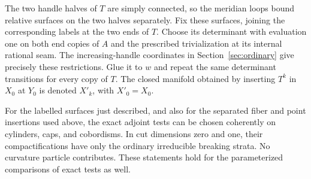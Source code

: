The two handle halves of $T$ are simply connected, so the meridian
loops bound relative surfaces on the two halves separately.  Fix these
surfaces, joining the corresponding labels at the two ends of $T$.
Choose its determinant with evaluation one on both end copies of $A$ and the prescribed trivialization at its internal
rational seam.  The increasing-handle coordinates in
Section~\ref{sec:ordinary} give precisely these restrictions.  Glue it
to $w$ and repeat the same determinant transitions for every copy of
$T$.  The closed manifold obtained by inserting $T^k$ in $X_0$ at
$Y_0$ is denoted $X'_k$, with $X'_0=X_0$.

\begin{lemma}
\label{lem:caps:labelled-compactness}
For the labelled surfaces just described, and also for the separated
fiber and point insertions used above, the exact adjoint tests can be
chosen coherently on cylinders, caps, and cobordisms.  In cut dimensions
zero and one, their compactifications have only the ordinary irreducible
breaking strata.  No curvature particle contributes.  These statements
hold for the parameterized comparisons of exact tests as well.
\end{lemma}

